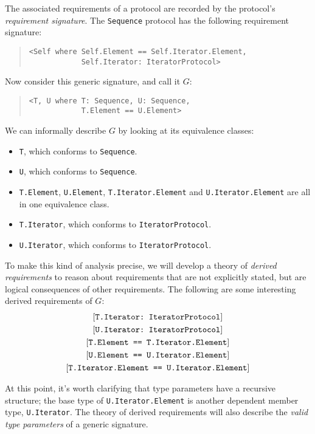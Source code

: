 \documentclass[../generics]{subfiles}
\begin{document}
The associated requirements of a protocol are recorded by the protocol's \emph{requirement signature}. The \texttt{Sequence} protocol has the following requirement signature:
\begin{quote}
\begin{verbatim}
<Self where Self.Element == Self.Iterator.Element,
            Self.Iterator: IteratorProtocol>
\end{verbatim}
\end{quote}
Now consider this generic signature, and call it $G$:
\begin{quote}
\begin{verbatim}
<T, U where T: Sequence, U: Sequence,
            T.Element == U.Element>
\end{verbatim}
\end{quote}
We can informally describe $G$ by looking at its equivalence classes:
\begin{itemize}
\item \texttt{T}, which conforms to \texttt{Sequence}.
\item \texttt{U}, which conforms to \texttt{Sequence}.
\item \texttt{T.Element}, \texttt{U.Element}, \texttt{T.Iterator.Element} and \texttt{U.Iterator.Element} are all in one equivalence class.
\item \texttt{T.Iterator}, which conforms to \texttt{IteratorProtocol}.
\item \texttt{U.Iterator}, which conforms to \texttt{IteratorProtocol}.
\end{itemize}
To make this kind of analysis precise, we will develop a theory of \emph{derived requirements} to reason about requirements that are not explicitly stated, but are logical consequences of other requirements. The following are some interesting derived requirements of $G$:
\begin{gather*}
\ConfReq{T.Iterator}{IteratorProtocol}\\
\ConfReq{U.Iterator}{IteratorProtocol}\\
\SameReq{T.Element}{T.Iterator.Element}\\
\SameReq{U.Element}{U.Iterator.Element}\\
\SameReq{T.Iterator.Element}{U.Iterator.Element}
\end{gather*}

At this point, it's worth clarifying that type parameters have a recursive structure; the base type of \texttt{U.Iterator.Element} is another dependent member type, \texttt{U.Iterator}. The theory of derived requirements will also describe the \emph{valid type parameters} of a generic signature.
\end{document}
